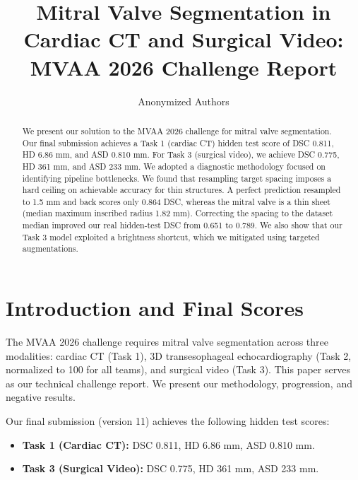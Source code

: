 \documentclass[runningheads]{llncs}
\begin{document}
\title{Mitral Valve Segmentation in Cardiac CT and Surgical Video: MVAA 2026 Challenge Report}

\author{Anonymized Authors}

\maketitle

\begin{abstract}
We present our solution to the MVAA 2026 challenge for mitral valve segmentation. Our final submission achieves a Task 1 (cardiac CT) hidden test score of DSC 0.811, HD 6.86 mm, and ASD 0.810 mm. For Task 3 (surgical video), we achieve DSC 0.775, HD 361 mm, and ASD 233 mm. We adopted a diagnostic methodology focused on identifying pipeline bottlenecks. We found that resampling target spacing imposes a hard ceiling on achievable accuracy for thin structures. A perfect prediction resampled to 1.5 mm and back scores only 0.864 DSC, whereas the mitral valve is a thin sheet (median maximum inscribed radius 1.82 mm). Correcting the spacing to the dataset median improved our real hidden-test DSC from 0.651 to 0.789. We also show that our Task 3 model exploited a brightness shortcut, which we mitigated using targeted augmentations.

\end{abstract}

\section{Introduction and Final Scores}

The MVAA 2026 challenge requires mitral valve segmentation across three modalities: cardiac CT (Task 1), 3D transesophageal echocardiography (Task 2, normalized to 100 for all teams), and surgical video (Task 3). This paper serves as our technical challenge report. We present our methodology, progression, and negative results.

Our final submission (version 11) achieves the following hidden test scores:
\begin{itemize}
    \item \textbf{Task 1 (Cardiac CT):} DSC 0.811, HD 6.86 mm, ASD 0.810 mm.
    \item \textbf{Task 3 (Surgical Video):} DSC 0.775, HD 361 mm, ASD 233 mm.
\end{itemize}
\end{document}
